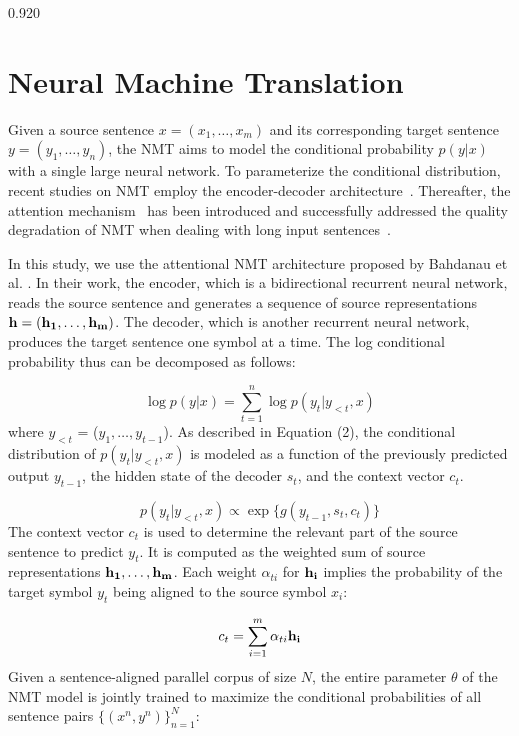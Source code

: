 \documentclass[11pt,letterpaper]{article}
\newcommand{\mylinespacing}{0.920}
\begin{document}
\begin{spacing}{\mylinespacing}
\section{Neural Machine Translation}

Given a source sentence \(x = (x_1, \ldots , x_m)\) and its corresponding target sentence \(y= (y_1, \ldots , y_n)\), the NMT aims to model the conditional probability \(p(y|x)\) with a single large neural network. To parameterize the conditional distribution, recent studies on NMT employ the encoder-decoder architecture~\cite{kalchbrenner2013recurrent,cho2014learning,sutskever2014sequence}. Thereafter, the attention mechanism~\cite{bahdanau2014neural,luong2015effective} has been introduced and successfully addressed the quality degradation of NMT when dealing with long input sentences~\cite{cho2014properties}.

In this study, we use the attentional NMT architecture proposed by Bahdanau et al. . In their work, the encoder, which is a bidirectional recurrent neural network, reads the source sentence and generates a sequence of source representations \(\bf{h} =(\bf{h_1}, \ldots , \bf{h_m}) \). The decoder, which is another recurrent neural network, produces the target sentence one symbol at a time. The log conditional probability thus can be decomposed as follows:

\begin{equation} 
\log p(y|x) = \sum_{t=1}^{n} \log p(y_t|y_{<t}, x)
\end{equation}
where \(y_{<t}\) = (\(y_1, \ldots , y_{t-1}\)). As described in Equation (2), the conditional distribution of \(p(y_t|y_{<t}, x)\) is modeled as a function of the previously predicted output \(y_{t-1}\), the hidden state of the decoder \(s_t\), and the context vector \(c_t\).

\begin{equation}
p(y_t|y_{<t}, x) \propto \exp \{g(y_{t-1}, s_t, c_t)\}
\end{equation}
The context vector \(c_t\) is used to determine the relevant part of the source sentence to predict \(y_t\). It is computed as the weighted sum of source representations \(\bf{h_1}, \ldots , \bf{h_m}\). Each weight \(\alpha_{ti}\) for \(\bf{h_i}\) implies the probability of the target symbol \(y_t\) being aligned to the source symbol \(x_i\):

\begin{equation}
c_t = \sum_{i=1}^{m} \alpha_{ti} \bf{h_i}
\end{equation}
Given a sentence-aligned parallel corpus of size \(N\), the entire parameter \(\theta\) of the NMT model is jointly trained to maximize the conditional probabilities of all sentence pairs \({ \{(x^n, y^n)\} }_{ n=1 }^{ N }\):


\end{spacing}
\end{document}
